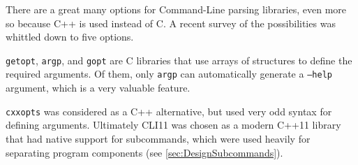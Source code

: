 There are a great many options for Command-Line parsing libraries, even more so because C++ is used instead of C.
A recent survey of the possibilities\cite{attractivechaos2018AC/C++} was whittled down to five options.

\texttt{getopt}\cite{FreeSoftwareFoundationGetopt3:Page}, \texttt{argp}\cite{GNUProjectArgpLibrary}, and \texttt{gopt}\cite{VajzovicGoptLibrary} are C libraries that use arrays of structures to define the required arguments.
Of them, only \texttt{argp} can automatically generate a \texttt{--help} argument, which is a very valuable feature.

\texttt{cxxopts}\cite{jarro2783Cxxopts:Parser} was considered as a C++ alternative, but used very odd syntax for defining arguments.
Ultimately CLI11\cite{CLIUtilsCLI11} was chosen as a modern C++11 library that had native support for subcommands, which were used heavily for separating program components (see \cref{sec:DesignSubcommands}).